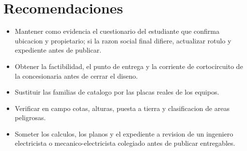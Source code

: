 \section{Recomendaciones}
\begin{itemize}
\item Mantener como evidencia el cuestionario del estudiante que confirma
  ubicacion y propietario; si la razon social final difiere, actualizar rotulo
  y expediente antes de publicar.
\item Obtener la factibilidad, el punto de entrega y la corriente de
  cortocircuito de la concesionaria antes de cerrar el diseno.
\item Sustituir las familias de catalogo por las placas reales de los equipos.
\item Verificar en campo cotas, alturas, puesta a tierra y clasificacion de
  areas peligrosas.
\item Someter los calculos, los planos y el expediente a revision de un
  ingeniero electricista o mecanico-electricista colegiado antes de publicar
  entregables.
\end{itemize}
